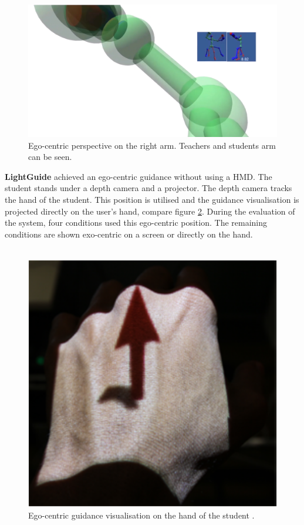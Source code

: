 \begin{figure}
	\centering
	\includegraphics[width=1.0\textwidth]{img/OneBody_ego_persp.png}
	\caption{Ego-centric perspective on the right arm. Teachers and students arm can be seen. \cite{Hoang2016}}
	\label{fig:obEgoPersp}
\end{figure}
\textbf{LightGuide} \cite{Sodhi2012} achieved an ego-centric guidance without using a HMD. The student stands under a depth camera and a projector. The depth camera tracks the hand of the student. This position is utilised and the guidance visualisation is projected directly on the user's hand, compare figure \ref{fig:lightguidepersp}. During the evaluation of the system, four conditions used this ego-centric position. The remaining conditions are shown exo-centric on a screen or directly on the hand.\\ \\
\begin{figure}
	\centering
	\includegraphics[width=1.0\textwidth]{img/LightGuide_Persp.png}
	\caption{Ego-centric guidance visualisation on the hand of the student \cite{Sodhi2012}.}
	\label{fig:lightguidepersp}
\end{figure}
